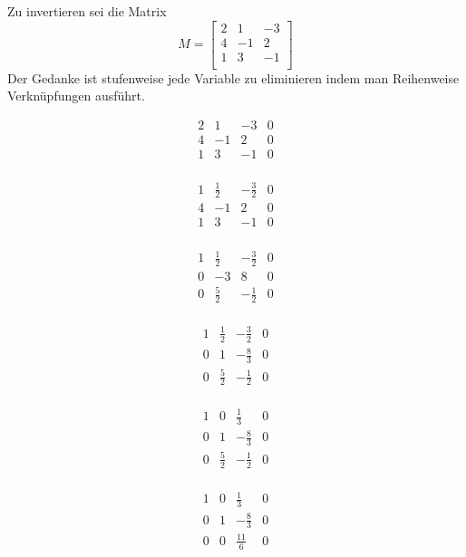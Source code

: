 \documentclass[letterpaper, titlepage]{article}
\begin{document}
Zu invertieren sei die Matrix $$M = \begin{bmatrix}
    2 & 1 & -3 \\
    4 & -1 & 2 \\
    1 & 3 & -1 \\
\end{bmatrix}$$
Der Gedanke ist stufenweise jede Variable zu eliminieren indem man Reihenweise Verknüpfungen ausführt.

\vspace*{0.2cm}

\[
\begin{array}{ccc|c}
    2 & 1 & -3 & 0 \\
    4 & -1 & 2 & 0 \\
    1 & 3 & -1 & 0 \\
\end{array}
\]

\[
\begin{array}{ccc|c}
    1 & \frac{1}{2} & -\frac{3}{2} & 0 \\
    4 & -1 & 2 & 0 \\
    1 & 3 & -1 & 0 \\
\end{array}
\]

\[
\begin{array}{ccc|c}
    1 & \frac{1}{2} & -\frac{3}{2} & 0 \\
    0 & -3 & 8 & 0 \\
    0 & \frac{5}{2} & -\frac{1}{2} & 0 \\
\end{array}
\]

\[
\begin{array}{ccc|c}
    1 & \frac{1}{2} & -\frac{3}{2} & 0 \\
    0 & 1 & -\frac{8}{3} & 0 \\
    0 & \frac{5}{2} & -\frac{1}{2} & 0 \\
\end{array}
\]

\[
\begin{array}{ccc|c}
    1 & 0 & \frac{1}{3} & 0 \\
    0 & 1 & -\frac{8}{3} & 0 \\
    0 & \frac{5}{2} & -\frac{1}{2} & 0 \\
\end{array}
\]

\[
\begin{array}{ccc|c}
    1 & 0 & \frac{1}{3} & 0 \\
    0 & 1 & -\frac{8}{3} & 0 \\
    0 & 0 & \frac{11}{6} & 0 \\
\end{array}
\]
\end{document}
